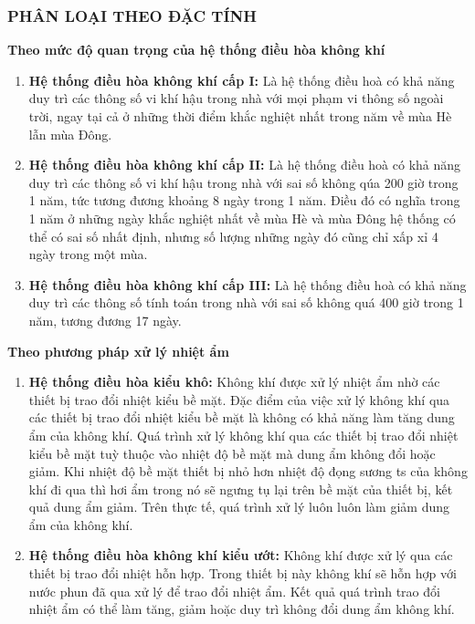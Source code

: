 	\subsubsection{PHÂN LOẠI THEO ĐẶC TÍNH}
	\textbf{Theo mức độ quan trọng của hệ thống điều hòa không khí}
	\begin{enumerate}
		\setlength\itemsep{1mm}
		\item \textbf{Hệ thống điều hòa không khí cấp I:} Là hệ thống điều hoà có khả năng duy trì các thông số vi khí hậu trong nhà với mọi phạm vi thông số ngoài trời, ngay tại cả ở những thời điểm khắc nghiệt nhất trong năm về mùa Hè lẫn mùa Đông.
		\item \textbf{Hệ thống điều hòa không khí cấp II:} Là hệ thống điều hoà có khả năng duy trì các thông số vi khí hậu trong nhà với sai số không qúa 200 giờ trong 1 năm, tức tương đương khoảng 8 ngày trong 1 năm. Điều đó có nghĩa trong 1 năm ở những ngày khắc nghiệt nhất về mùa Hè và mùa Đông hệ thống có thể có sai số nhất định, nhưng số lượng những ngày đó cũng chỉ xấp xỉ 4 ngày trong một mùa.
		\item \textbf{Hệ thống điều hòa không khí cấp III:} Là hệ thống điều hoà có khả năng duy trì các thông số tính toán trong nhà với sai số không quá 400 giờ trong 1 năm, tương đương 17 ngày.
	\end{enumerate}
	
	\textbf{Theo phương pháp xử lý nhiệt ẩm}
	\begin{enumerate}
		\setlength\itemsep{1mm}
		\item \textbf{Hệ thống điều hòa kiểu khô:} Không khí được xử lý nhiệt ẩm nhờ các thiết bị trao đổi nhiệt kiểu bề mặt. Đặc điểm của việc xử lý không khí qua các thiết bị trao đổi nhiệt kiểu bề mặt là không có khả năng làm tăng dung ẩm của không khí. Quá trình xử lý không khí qua các thiết bị trao đổi nhiệt kiểu bề mặt tuỳ thuộc vào nhiệt độ bề mặt mà dung ẩm không đổi hoặc giảm. Khi nhiệt độ bề mặt thiết bị nhỏ hơn nhiệt độ đọng sương ts của không khí đi qua thì hơi ẩm trong nó sẽ ngưng tụ lại trên bề mặt của thiết bị, kết quả dung ẩm giảm. Trên thực tế, quá trình xử lý luôn luôn làm giảm dung ẩm của không khí.
		\item \textbf{Hệ thống điều hòa không khí kiểu ướt:} Không khí được xử lý qua các thiết bị trao đổi nhiệt hỗn hợp. Trong thiết bị này không khí sẽ hỗn hợp với nước phun đã qua xử lý để trao đổi nhiệt ẩm. Kết quả quá trình trao đổi nhiệt ẩm có thể làm tăng, giảm hoặc duy trì không đổi dung ẩm không khí.
	\end{enumerate}
	
